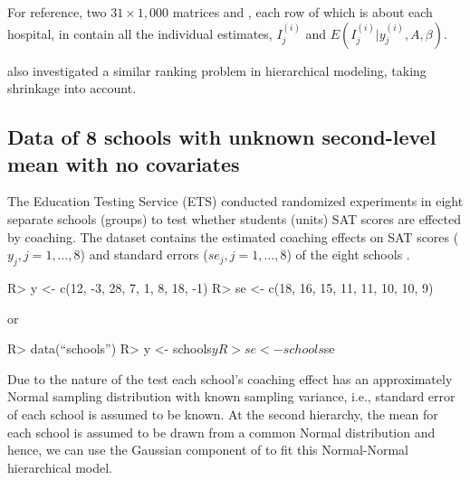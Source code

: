 \documentclass[article]{jss}
\begin{document}
For reference, two $31 \times 1,000$ matrices  and , each row of which is about each hospital, in  contain all the individual estimates, $I^{(i)}_{j}$ and $E(I^{(i)}_{j}\vert y^{(i)}_{j}, A, \beta)$.

\cite{1995} also investigated a similar ranking problem in hierarchical modeling, taking shrinkage into account.


\subsection[Unknown Second-level Mean and No Covariate]{Data of 8 schools with unknown second-level mean with no covariates} \label{sec:ex:8schools}

The Education Testing Service (ETS) conducted randomized experiments in eight separate schools (groups) to test whether students (units) SAT scores are effected by coaching. The dataset contains the estimated coaching effects on SAT scores ($y_{j}, j=1, \ldots, 8$) and standard errors ($se_{j}, j=1, \ldots, 8$) of the eight schools \citep{1981}.
\begin{CodeChunk}
\begin{CodeInput}
R> y  <- c(12, -3, 28,  7,  1,  8, 18, -1)
R> se <- c(18, 16, 15, 11, 11, 10, 10,  9)
\end{CodeInput}
\end{CodeChunk}
or
\begin{CodeChunk}
\begin{CodeInput}
R> data(``schools'')
R> y  <- schools$y
R> se <- schools$se
\end{CodeInput}
\end{CodeChunk}



Due to the nature of the test each school's coaching effect has an approximately Normal sampling distribution with known sampling variance, i.e., standard error of each school is assumed to be known. At the second hierarchy, the mean for each school is assumed to be drawn from a common Normal distribution and hence, we can use the Gaussian component of  to fit this Normal-Normal hierarchical model.
\end{document}
